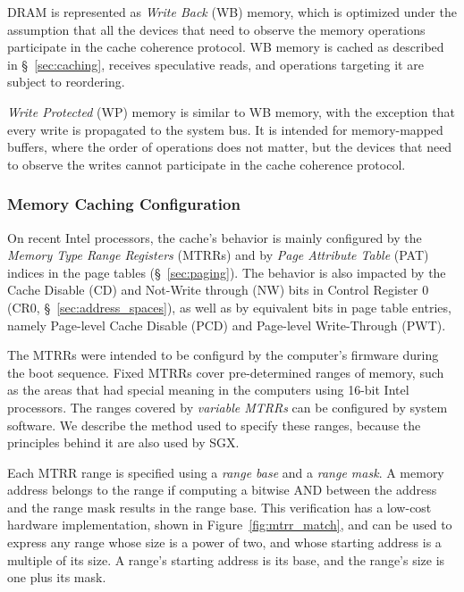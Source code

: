 DRAM is represented as \textit{Write Back} (WB) memory, which is optimized
under the assumption that all the devices that need to observe the memory
operations participate in the cache coherence protocol. WB memory is cached as
described in \S~\ref{sec:caching}, receives speculative reads, and operations
targeting it are subject to reordering.

\textit{Write Protected} (WP) memory is similar to WB memory, with the
exception that every write is propagated to the system bus. It is intended for
memory-mapped buffers, where the order of operations does not matter, but the
devices that need to observe the writes cannot participate in the cache
coherence protocol.


\subsubsection{Memory Caching Configuration}
\label{sec:cacheability_config}


On recent Intel processors, the cache's behavior is mainly configured by the
\textit{Memory Type Range Registers} (MTRRs) and by
\textit{Page Attribute Table} (PAT) indices in the page tables
(\S~\ref{sec:paging}). The behavior is also impacted by the Cache Disable (CD)
and Not-Write through (NW) bits in Control Register 0
(CR0, \S~\ref{sec:address_spaces}), as well as by equivalent bits in page table
entries, namely Page-level Cache Disable (PCD) and Page-level Write-Through
(PWT).

The MTRRs were intended to be configurd by the computer's firmware during the
boot sequence. Fixed MTRRs cover pre-determined ranges of memory, such as the
areas that had special meaning in the computers using 16-bit Intel processors.
The ranges covered by \textit{variable MTRRs} can be configured by system
software. We describe the method used to specify these ranges, because the
principles behind it are also used by SGX.


Each MTRR range is specified using a \textit{range base} and a
\textit{range mask}. A memory address belongs to the range if computing a
bitwise AND between the address and the range mask results in the range base.
This verification has a low-cost hardware implementation, shown in
Figure~\ref{fig:mtrr_match}, and can be used to express any range whose size is
a power of two, and whose starting address is a multiple of its size. A range's
starting address is its base, and the range's size is one plus its mask.

